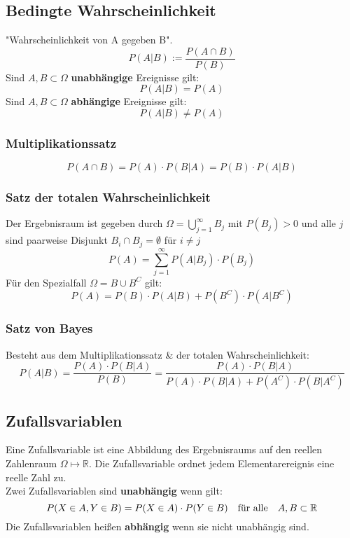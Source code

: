 \documentclass[12pt]{article}
\begin{document}
\subsection{Bedingte Wahrscheinlichkeit}
"Wahrscheinlichkeit von A gegeben B".
\begin{equation*}
	P(A|B) := \frac{P(A\cap B)}{P(B)}
\end{equation*}
Sind $A, B \subset \Omega$ \textbf{unabhängige} Ereignisse gilt:
\begin{equation*}
	P(A|B) = P(A)
\end{equation*}
Sind $A, B \subset \Omega$ \textbf{abhängige} Ereignisse gilt:
\begin{equation*}
	P(A|B) \neq P(A)
\end{equation*}
\subsubsection{Multiplikationssatz}
\begin{equation*}
	P(A\cap B) = P(A) \cdot P(B|A) = P(B) \cdot P(A|B)
\end{equation*}
\subsubsection{Satz der totalen Wahrscheinlichkeit}
Der Ergebnisraum ist gegeben durch $\Omega = \bigcup\limits_{j=1}^\infty B_j$ mit $P(B_j)>0$ und alle $j$ sind paarweise Disjunkt $B_i \cap B_j = \emptyset$ für $i\neq j$
\begin{equation*}
	P(A) = \sum_{j=1}^\infty P(A|B_j) \cdot P(B_j)
\end{equation*}
Für den Spezialfall $\Omega = B\cup B^C$ gilt:
\begin{equation*}
	P(A) = P(B) \cdot P(A|B) + P(B^C) \cdot P(A|B^C)
\end{equation*}
\subsubsection{Satz von Bayes}
Besteht aus dem Multiplikationssatz \& der totalen Wahrscheinlichkeit:
\begin{equation*}
	P(A|B)=\frac{P(A)\cdot P(B|A)}{P(B)}= \frac{P(A)\cdot P(B|A)}{P(A)\cdot P(B|A) + P(A^C)\cdot P(B|A^C)}
\end{equation*}
\subsection{Zufallsvariablen}
Eine Zufallsvariable ist eine Abbildung des Ergebnisraums auf den reellen Zahlenraum $\Omega\longmapsto\mathbb{R}$. Die Zufallsvariable ordnet jedem Elementarereignis eine reelle Zahl zu.\\
Zwei Zufallsvariablen sind \textbf{unabhängig} wenn gilt:
\begin{equation*}
	P(X\in A, Y\in B) = P(X\in A) \cdot P(Y\in B) \text{\quad für alle\quad} A,B\subset \mathbb{R} 
\end{equation*}
Die Zufallsvariablen heißen \textbf{abhängig} wenn sie nicht unabhängig sind.
\end{document}
